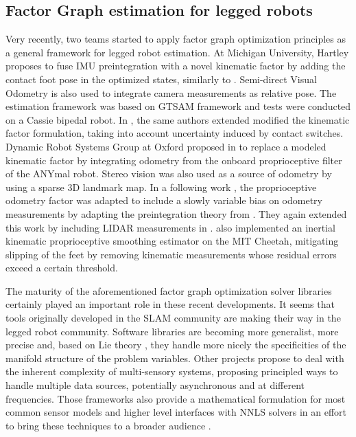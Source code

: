 \subsection{Factor Graph estimation for legged robots}
Very recently, two teams started to apply factor graph optimization principles as a general framework for legged robot estimation. At Michigan University, Hartley \cite{hartley2018legged} 
proposes to fuse IMU preintegration with a novel kinematic factor by adding the contact foot pose in the optimized states, similarly to \cite{bloesch2013state,rotella2014state}. 
Semi-direct Visual Odometry \cite{forster2014svo} is also used to integrate camera measurements as relative pose. The estimation framework was based on GTSAM framework \cite{dellaert2012factor}
and tests were conducted on a Cassie bipedal robot. In \cite{hartley2018hybrid}, the same authors extended 
modified the kinematic factor formulation, taking into account uncertainty induced by contact switches. Dynamic Robot Systems Group at Oxford proposed in 
\cite{wisth2019robust} to replace a modeled kinematic factor by integrating odometry from the onboard proprioceptive filter of the ANYmal robot. Stereo vision was also used as a source of
odometry by using a sparse 3D landmark map. In a following work \cite{wisth2020preintegrated}, the proprioceptive odometry factor was adapted
to include a slowly variable bias on odometry measurements by adapting the preintegration theory from \cite{forster2017-TRO}. They again extended this work
by including LIDAR measurements in \cite{wisth2021vilens}.
\cite{kim2021legged} also implemented an inertial kinematic proprioceptive smoothing estimator on the MIT Cheetah, mitigating slipping of the feet by removing kinematic 
measurements whose residual errors exceed a certain threshold.    


The maturity of the aforementioned factor graph optimization solver libraries certainly played an important role in these recent developments. It seems
that tools originally developed in the SLAM community are making their way in the legged robot community. Software libraries are becoming more
generalist, more precise and, based on Lie theory \cite{sola2018micro}, they handle more nicely the specificities of the manifold structure of the problem variables.
Other projects propose to deal with the inherent complexity of multi-sensory systems, proposing principled ways to handle multiple data sources, potentially asynchronous and at
different frequencies. Those frameworks also provide a mathematical formulation for most common sensor models and higher level interfaces with NNLS solvers 
in an effort to bring these techniques to a broader audience \cite{sola2021wolf, blanco2019modular, colosi2020plug}.

